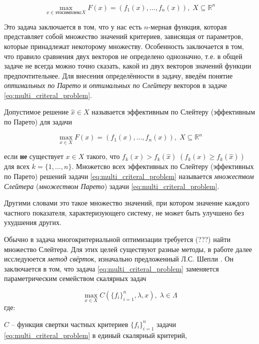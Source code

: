 \begin{equation}
	\max\limits_{x \in это симплекс X} F(x)=({f}_1(x),\ldots, {f}_n(x))
	, \; X \subseteq \mathbb{R}^n	
	\label{eq:multi_criteral_problem}
\end{equation}

Это задача заключается в том, что у нас есть $n$-мерная функция,
которая представляет собой множество значений критериев, зависящая
от параметров, которые принадлежат некоторому множеству.
Особенность заключается в том, что правило сравнения двух векторов
не определено однозначно, т.е. в общей задаче не всегда можно точно сказать,
какой из двух векторов значений функции предпочтительнее.
Для внесения определённости в задачу, введём понятие
\textit{оптимальных по Парето} и \textit{оптимальных по Слейтеру}
векторов в задаче \eqref{eq:multi_criteral_problem}.

\begin{Def}
	Допустимое решение $\hat{x}\in{X}$ называется 
	эффективным по Слейтеру (эффективным по Парето) для задачи
		
	$$	
		\max\limits_{x \in X} F(x)=({f}_1(x),\ldots, {f}_n(x))
		, \; X \subseteq \mathbb{R}^n	
	$$	
	
	если \textbf{не} существует $x\in{X}$ такого, что 
	$f_k(x)>f_k(\hat{x}) \; (f_k(x) \geqslant f_k(\hat{x}))$ для всех
	$k=\{1,...,n\}$. Множетсво всех эффективных по Слейтеру 
	(эффективных по Парето) решений задачи 
	\eqref{eq:multi_criteral_problem} называется 
	\textit{множеством Слейтера} (\textit{множеством Парето}) 
	задачи \eqref{eq:multi_criteral_problem}.
\end{Def}

Другими словами это такое множество значений, 
при котором значение каждого частного показателя, характеризующего систему, не может быть улучшено без ухудшения других.

Обычно в задача многокритериальной оптимизации требуется (???)
найти множество Слейтера. Для этих целей существуют разные методы,
в работе далее исследуюется \textit{метод свёрток},
изначально предложенный Л.С. Шепли \cite{shapley}. 
Он заключается в том, что задача \eqref{eq:multi_criteral_problem}
заменяется параметрическим семейством скалярных задач 

	$$
		\max\limits_{x \in X} C(\{f_i\}_{i=1}^{n}, \lambda, x), \;
		\lambda \in \Lambda
	$$
	где: 
 
	$C$ – функция свертки частных критериев $\{f_i\}_{i=1}^n$ задачи 
\eqref{eq:multi_criteral_problem} в единый скалярный критерий,
 
